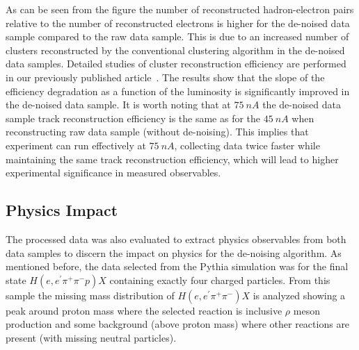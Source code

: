 As can be seen from the figure the number of reconstructed hadron-electron pairs relative to the number of reconstructed electrons is higher for the de-noised data sample compared to the raw data sample. This is due to an increased number of clusters reconstructed by the conventional clustering algorithm in the de-noised data samples. Detailed studies of cluster reconstruction efficiency are performed 
in our previously published article~\cite{Thomadakis:2022zcd}. 
The results show that the slope of the efficiency degradation as a function of the luminosity is significantly improved in the de-noised data sample. 
It is worth noting that at $75~nA$ the de-noised data sample track reconstruction efficiency is the same as for the $45~nA$ when reconstructing raw data sample (without de-noising). This implies that experiment can run effectively at $75~nA$, collecting data twice faster while maintaining the same track reconstruction efficiency, which will lead to higher experimental significance in measured observables.

\subsection{Physics Impact}

The processed data was also evaluated to extract physics observables from both data samples to discern the impact on physics for the de-noising algorithm. As mentioned before, the data selected from the Pythia simulation was for the final state $H(e,e^\prime\pi^+\pi^-p)X$ containing exactly four charged particles. From this sample the missing mass distribution of $H(e,e^\prime\pi^+\pi^-)X$ is analyzed showing a peak around proton mass where the selected reaction is inclusive $\rho$ meson production and some background (above proton mass) where other reactions  are present (with missing neutral particles).

